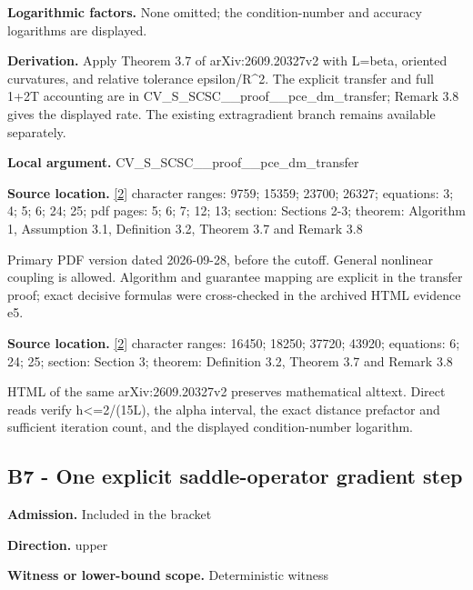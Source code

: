 \documentclass[10pt,a4paper]{article}
\begin{document}
\textbf{Logarithmic factors.} None omitted; the condition-number and accuracy logarithms are displayed.



\textbf{Derivation.} Apply Theorem 3.7 of arXiv:2609.20327v2 with L=beta, oriented curvatures, and relative tolerance epsilon/R\textasciicircum{}2. The explicit transfer and full 1+2T accounting are in CV\_S\_SCSC\_\_proof\_\_pce\_dm\_transfer; Remark 3.8 gives the displayed rate. The existing extragradient branch remains available separately.



\textbf{Local argument.} CV\_S\_SCSC\_\_proof\_\_pce\_dm\_transfer



\textbf{Source location.} \href{https://arxiv.org/pdf/2609.20327v2}{[2]} character ranges: 9759; 15359; 23700; 26327; equations: 3; 4; 5; 6; 24; 25; pdf pages: 5; 6; 7; 12; 13; section: Sections 2-3; theorem: Algorithm 1, Assumption 3.1, Definition 3.2, Theorem 3.7 and Remark 3.8



Primary PDF version dated 2026-09-28, before the cutoff. General nonlinear coupling is allowed. Algorithm and guarantee mapping are explicit in the transfer proof; exact decisive formulas were cross-checked in the archived HTML evidence e5.



\textbf{Source location.} \href{https://arxiv.org/pdf/2609.20327v2}{[2]} character ranges: 16450; 18250; 37720; 43920; equations: 6; 24; 25; section: Section 3; theorem: Definition 3.2, Theorem 3.7 and Remark 3.8



HTML of the same arXiv:2609.20327v2 preserves mathematical alttext. Direct reads verify h<=2/(15L), the alpha interval, the exact distance prefactor and sufficient iteration count, and the displayed condition-number logarithm.



\subsection{B7 - One explicit saddle-operator gradient step}


\textbf{Admission.} Included in the bracket



\textbf{Direction.} upper



\textbf{Witness or lower-bound scope.} Deterministic witness
\end{document}

